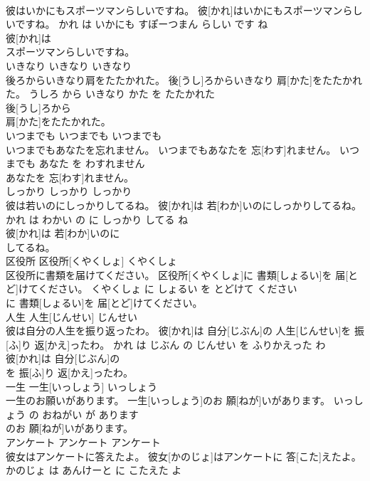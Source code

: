 \documentclass[8pt]{extreport}
\begin{document}
\begin{CJK}{UTF8}{min}
\\	彼はいかにもスポーツマンらしいですね。	彼[かれ]はいかにもスポーツマンらしいですね。	かれ は いかにも すぽーつまん らしい です ね	
\\	彼[かれ]は
\\	スポーツマンらしいですね。			
\\	いきなり	いきなり	いきなり	
\\	後ろからいきなり肩をたたかれた。	後[うし]ろからいきなり 肩[かた]をたたかれた。	うしろ から いきなり かた を たたかれた	
\\	後[うし]ろから
\\	肩[かた]をたたかれた。			
\\	いつまでも	いつまでも	いつまでも	
\\	いつまでもあなたを忘れません。	いつまでもあなたを 忘[わす]れません。	いつまでも あなた を わすれません	
\\	あなたを 忘[わす]れません。			
\\	しっかり	しっかり	しっかり	
\\	彼は若いのにしっかりしてるね。	彼[かれ]は 若[わか]いのにしっかりしてるね。	かれ は わかい の に しっかり してる ね	
\\	彼[かれ]は 若[わか]いのに
\\	してるね。			
\\	区役所	区役所[くやくしょ]	くやくしょ	
\\	区役所に書類を届けてください。	区役所[くやくしょ]に 書類[しょるい]を 届[とど]けてください。	くやくしょ に しょるい を とどけて ください	
\\	に 書類[しょるい]を 届[とど]けてください。			
\\	人生	人生[じんせい]	じんせい	
\\	彼は自分の人生を振り返ったわ。	彼[かれ]は 自分[じぶん]の 人生[じんせい]を 振[ふ]り 返[かえ]ったわ。	かれ は じぶん の じんせい を ふりかえった わ	
\\	彼[かれ]は 自分[じぶん]の
\\	を 振[ふ]り 返[かえ]ったわ。			
\\	一生	一生[いっしょう]	いっしょう	
\\	一生のお願いがあります。	一生[いっしょう]のお 願[ねが]いがあります。	いっしょう の おねがい が あります	
\\	のお 願[ねが]いがあります。			
\\	アンケート	アンケート	アンケート	
\\	彼女はアンケートに答えたよ。	彼女[かのじょ]はアンケートに 答[こた]えたよ。	かのじょ は あんけーと に こたえた よ	

\end{CJK}
\end{document}
